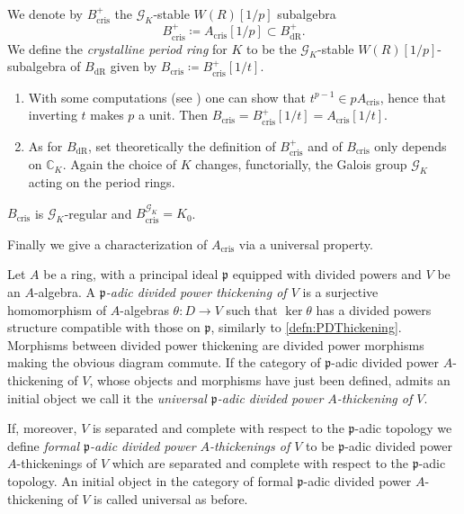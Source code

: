\begin{defn}[]
	We denote by $B_{\mathrm{cris}}^+$ the $\mathscr{G}_K$-stable $W(R)[1/p]$ subalgebra 
	\begin{equation*}
	B_{\mathrm{cris}}^+ \coloneqq A_{\mathrm{cris}}[1/p] \subset B_{\mathrm{dR}}^+
	.\end{equation*}
	We define the {\em crystalline period ring} for $K$
	to be the $\mathscr{G}_K$-stable $W(R)[1/p]$-subalgebra of $B_{\mathrm{dR}}$
	given by $B_{\mathrm{cris}} \coloneqq B_{\mathrm{cris}}^+[1/t]$.
\end{defn}


\begin{rem}[]\leavevmode\vspace{-.2\baselineskip}
\begin{enumerate}
\item With some computations (see \cite[Proposition 9.1.3]{Brinon})
	one can show that $t^{p-1} \in p A_{\mathrm{cris}}$, hence that 
	inverting $t$ makes $p$ a unit.
	Then $B_{\mathrm{cris}} = B_{\mathrm{cris}}^+[1/t] = A_{\mathrm{cris}}[1/t]$.

\item As for $B_{\mathrm{dR}}$, set theoretically the definition of $B_{\mathrm{cris}}^+$ and
	of $B_{\mathrm{cris}}$ only depends on $\mathbb{C}_{K}$.
	Again the choice of $K$ changes, functorially, the Galois group $\mathscr{G}_K$ acting on the
	period rings.
\end{enumerate}
\end{rem}


\begin{prop}
	$B_{\mathrm{cris}}$ is $\mathscr{G}_K$-regular
	and $B_{\mathrm{cris}}^{\mathscr{G}_K} = K_0$.
\end{prop}


\noindent
Finally we give a characterization of $A_{\mathrm{cris}}$ via
a universal property.
\begin{defn}
	Let $A$ be a ring, with a principal ideal $\mathfrak{p}$
	equipped with divided powers and $V$ be an $A$-algebra.
	A {\em $\mathfrak{p}$-adic divided power thickening of $V$}
	is a surjective homomorphism of $A$-algebras
	$\theta\colon D \to V$ such that $\ker \theta$ has a divided powers structure
	compatible with those on $\mathfrak{p}$, similarly to \cref{defn:PDThickening}.
	Morphisms between divided power thickening are divided power morphisms
	making the obvious diagram commute.
	If the category of $\mathfrak{p}$-adic divided power $A$-thickening of $V$,
	whose objects and morphisms have just been defined, admits an initial object
	we call it the {\em universal $\mathfrak{p}$-adic divided power $A$-thickening of $V$}.
	
	If, moreover, $V$ is separated and complete with respect to the $\mathfrak{p}$-adic topology
	we define {\em formal $\mathfrak{p}$-adic divided power $A$-thickenings of $V$} to be
	$\mathfrak{p}$-adic divided power $A$-thickenings of $V$ which are separated and complete
	with respect to the $\mathfrak{p}$-adic topology.
	An initial object in the category of formal $\mathfrak{p}$-adic divided power $A$-thickening
	of $V$ is called universal as before.
\end{defn}


